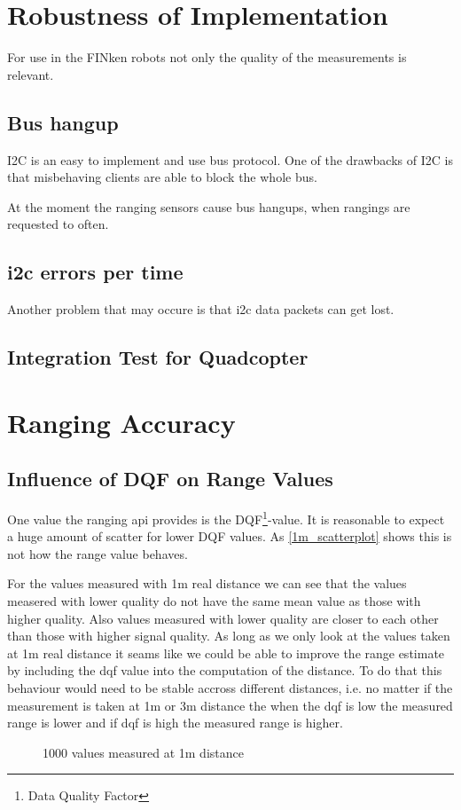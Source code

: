 
\section{Robustness of Implementation}

For use in the FINken robots not only the quality of the measurements is relevant.

\subsection{Bus hangup}
I2C is an easy to implement and use bus protocol.
One of the drawbacks of I2C is that misbehaving clients are able to block the whole bus.

At the moment the ranging sensors cause bus hangups, when rangings are requested to often.

\subsection{i2c errors per time}
Another problem that may occure is that i2c data packets can get lost.

\subsection{Integration Test for Quadcopter}


\section{Ranging Accuracy}

\subsection{Influence of DQF on Range Values}
One value the ranging api provides is the DQF\footnote{Data Quality Factor}-value.
It is reasonable to expect a huge amount of scatter for lower DQF values.
As \autoref{1m_scatterplot} shows this is not how the range value behaves.

For the values measured with 1m real distance we can see that the values measered with lower quality do not have the same mean value as those with higher quality.
Also values measured with lower quality are closer to each other than those with higher signal quality.
As long as we only look at the values taken at 1m real distance it seams like we could be able to improve the range estimate by including the dqf value into the computation of the distance.
To do that this behaviour would need to be stable accross different distances, i.e. no matter if the measurement is taken at 1m or 3m distance the when the dqf is low the measured range is lower and if dqf is high the measured range is higher.
\begin{figure}[H]
	\centering
	
	\caption{1000 values measured at 1m distance}
	\label{1m_scatterplot}
\end{figure}

